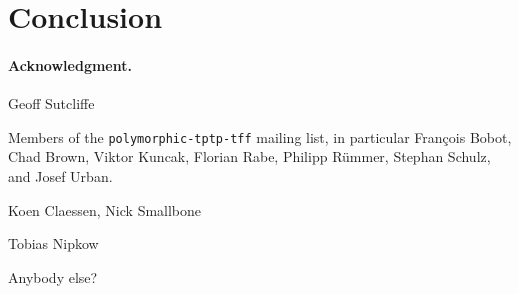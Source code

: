 \section{Conclusion}
\label{sec_concl}

\def\ackname{Acknowledgment}
\paragraph{\textbf{\upshape\ackname.}}
%

Geoff Sutcliffe

Members of the {\tt polymorphic-tptp-tff} mailing list, in particular
Fran\c{c}ois Bobot, Chad Brown, Viktor Kuncak, Florian Rabe, Philipp R\"ummer,
Stephan Schulz, and Josef Urban.

Koen Claessen, Nick Smallbone

Tobias Nipkow

Anybody else?
